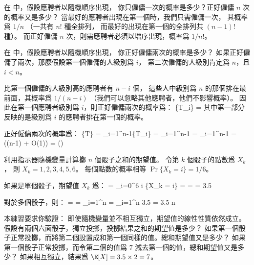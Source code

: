 \startsection[
  title={Indicator random variables},
]

\startEXERCISE
在  中，假設應聘者以隨機順序出現，
你只僱傭一次的概率是多少？正好僱傭 $n$ 次的概率又是多少？
\stopEXERCISE
\startANSWER
當最好的應聘者出現在第一個時，我們只需僱傭一次，
其概率爲 $1/n$ （一共有 $n!$ 種全排列，
而最好的出現在第一個的全排列共 $(n-1)!$ 種）。
而正好僱傭 $n$ 次，則需應聘者必須以增序出現，概率爲 $1/n!$。
\stopANSWER

\startEXERCISE
在  中，假設應聘者以隨機順序出現，
你正好僱傭兩次的概率是多少？
\stopEXERCISE
\startANSWER
如果正好僱傭了兩次，那麼假設第一個僱傭的人級別爲 $i$，
第二次僱傭的人級別肯定爲 $n$，且 $i < n$。

比第一個僱傭的人級別高的應聘者有 $n-i$ 個，
這些人中級別爲 $n$ 的那個排在最前面，其概率爲 $1/(n-i)$
（我們可以忽略其他應聘者，他們不影響概率）。
因此在第一個應聘者級別爲 $i$，則正好僱傭兩次的概率爲：
\startformula
\Pr\{T_i\} = 
\stopformula
其中第一部分反映的是級別爲 $i$ 的應聘者排在第一個的概率。

正好僱傭兩次的概率爲：
\startsplitformula\startmathalignment
\NC \Pr\{T\} \NC= \sum_{i=1}^{n-1}\Pr\{T_i\} \NR
\NC        \NC= \sum_{i=1}^{n-1} \NR
\NC        \NC=  \sum_{i=1}^{n-1} \NR
\NC        \NC=  (\lg(n-1) + O(1)) \NR
\NC        \NC= \Omega()
\stopmathalignment\stopsplitformula
\stopANSWER

\startEXERCISE
利用指示器隨機變量計算擲 $n$ 個骰子之和的期望值。
\stopEXERCISE
\startANSWER
令第 $k$ 個骰子的點數爲 $X_k$，
則 $X_k = 1,2,3,4,5,6$。
每個點數的概率相等 $\Pr\{X_k=i\}=1/6$。

如果是單個骰子，期望值 $X_k$ 爲：
\startsplitformula\startmathalignment
\NC \E[X_k]
   \NC= \sum_{i=0}^6 i \Pr\{X_k = i\} \NR
\NC\NC=  \NR
\NC\NC=  \NR
\NC\NC= 3.5 \NR
\stopmathalignment\stopsplitformula

對於多個骰子，則：
\startsplitformula\startmathalignment
\NC \E[X] \NC= \E[\sum_{i=1}^nX_i] \NR
\NC      \NC= \sum_{i=1}^n \E[X_i] \NR
\NC      \NC= \sum_{i=1}^n 3.5 \NR
\NC      \NC= 3.5 \cdot n \NR
\stopmathalignment\stopsplitformula
\stopANSWER

\startEXERCISE
本練習要求你驗證：
即使隨機變量並不相互獨立，期望值的線性性質依然成立。
假設有兩個六面骰子，獨立投擲，投擲結果之和的期望值是多少？
如果第一個骰子正常投擲，而將第二個設置成和第一個同樣的值。總和期望值又是多少？
如果第一個骰子正常投擲，而令第二個的值爲 $7$ 減去第一個的值，總和期望值又是多少？
\stopEXERCISE
\startANSWER
如果相互獨立，結果爲 $\E[X] = 3.5 \times 2 = 7$。

